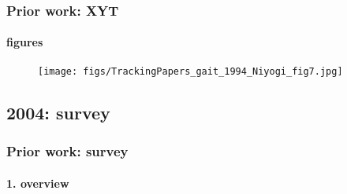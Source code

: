 \begin{frame}
\frametitle{Prior work: XYT}
\framesubtitle{figures}
\logoCSIPCPL\mypagenum
	\begin{figure}
		\texttt{[image: figs/TrackingPapers\_gait\_1994\_Niyogi\_fig7.jpg]}
	\end{figure}
\end{frame}



\subsection{2004: survey}
\begin{frame}
\frametitle{Prior work: survey}
\framesubtitle{1. overview}
\logoCSIPCPL\mypagenum
\end{frame}


\printbibliography

